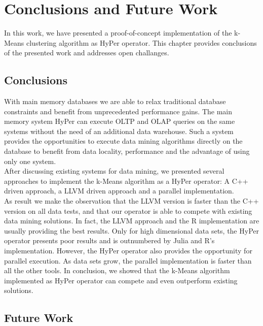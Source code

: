\chapter{Conclusions and Future Work}\label{chapter:conclusion}
In this work, we have presented a proof-of-concept implementation of the k-Means clustering algorithm as HyPer operator. This chapter provides conclusions of the presented work and addresses open challanges.

\section{Conclusions}
With main memory databases we are able to relax traditional database constraints and benefit from unprecedented performance gains. The main memory system HyPer can execute OLTP and OLAP queries on the same systems without the need of an additional data warehouse. Such a system provides the opportunities to execute data mining algorithms directly on the database to benefit from data locality, performance and the advantage of using only one system. 
\\
After discussing existing systems for data mining, we presented several approaches to implement the k-Means algorithm as a HyPer operator: A C++ driven approach, a LLVM driven approach and a parallel implementation.
\\
As result we make the observation that the LLVM version is faster than the C++ version on all data tests, and that our operator is able to compete with existing data mining solutions. In fact, the LLVM approach and the R implementation are usually providing the best results. Only for high dimensional data sets, the HyPer operator presents poor results and is outnumbered by Julia and R's implementation. However, the HyPer operator also provides the opportunity for parallel execution. As data sets grow, the parallel implementation is faster than all the other tools.
In conclusion, we showed that the k-Means algorithm implemented as HyPer operator can compete and even outperform existing solutions.

\section{Future Work}

